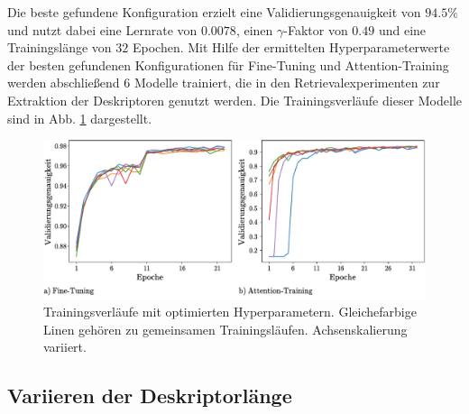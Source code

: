 Die beste gefundene Konfiguration erzielt eine Validierungsgenauigkeit von $94.5\%$ und nutzt dabei eine Lernrate von $0.0078$, einen $\gamma$-Faktor von $0.49$ und eine Trainingslänge von $32$ Epochen. 
Mit Hilfe der ermittelten Hyperparameterwerte der besten gefundenen Konfigurationen für Fine-Tuning und Attention-Training werden abschließend $6$ Modelle trainiert, die in den Retrievalexperimenten zur Extraktion der Deskriptoren genutzt werden. Die Trainingsverläufe dieser Modelle sind in Abb. \ref{optimized_runs} dargestellt.
\begin{figure}[h]
\includegraphics[scale=0.75]{NNOPT/6_model_verlauf}
\caption{Trainingsverläufe mit optimierten Hyperparametern. Gleichefarbige Linen gehören zu gemeinsamen Trainingsläufen. Achsenskalierung variiert.}
\label{optimized_runs}
\end{figure}

\subsection{Variieren der Deskriptorlänge}\label{pca_experiments}

